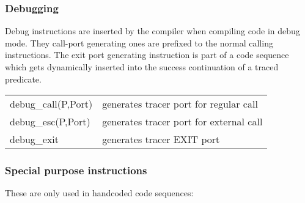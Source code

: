 \subsubsection{Debugging}
Debug instructions are inserted by the compiler when compiling code in
debug mode.  They call-port generating ones are prefixed to the normal
calling instructions.  The exit port generating instruction is part of
a code sequence which gets dynamically inserted into the success
continuation of a traced predicate.

\begin{tabular}{|p{}|p{}|}
\hline
debug_call(P,Port)      & generates tracer port for regular call \\
debug_esc(P,Port)      & generates tracer port for external call \\
debug_exit              & generates tracer EXIT port \\
\hline
\end{tabular}

\subsubsection{Special purpose instructions}
These are only used in handcoded code sequences:

